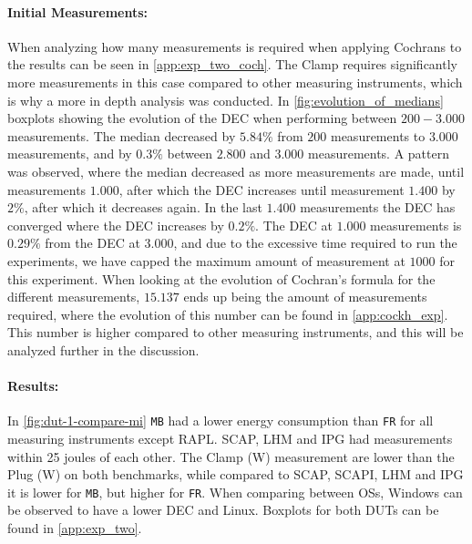 \paragraph{Initial Measurements:} When analyzing how many measurements is required when applying Cochrans to the results can be seen in \cref{app:exp_two_coch}. %
The Clamp requires significantly more measurements in this case compared to other measuring instruments, which is why a more in depth analysis was conducted. In \cref{fig:evolution_of_medians} boxplots showing the evolution of the DEC when performing between $200-3.000$ measurements. The median decreased by $5.84\%$ from $200$ measurements to $3.000$ measurements, and by $0.3\%$ between $2.800$ and $3.000$ measurements. A pattern was observed, where the median decreased as more measurements are made, until measurements $1.000$, after which the DEC increases until measurement $1.400$ by $2\%$, after which it decreases again. In the last $1.400$ measurements the DEC has converged where the DEC increases by $0.2\%$. The DEC at $1.000$ measurements is $0.29\%$ from the DEC at $3.000$, and due to the excessive time required to run the experiments, we have capped the maximum amount of measurement at $1000$ for this experiment. When looking at the evolution of Cochran's formula for the different measurements, $15.137$ ends up being the amount of measurements required, where the evolution of this number can be found in \cref{app:cockh_exp}. This number is higher compared to other measuring instruments, and this will be analyzed further in the discussion.


\paragraph{Results:} %
In \cref{fig:dut-1-compare-mi} \texttt{MB} had a lower energy consumption than \texttt{FR} for all measuring instruments except RAPL. SCAP, LHM and IPG had measurements within 25 joules of each other. The Clamp (W) measurement are lower than the Plug (W) on both benchmarks, while compared to SCAP, SCAPI, LHM and IPG it is lower for \texttt{MB}, but higher for \texttt{FR}. When comparing between OSs, Windows can be observed to have a lower DEC and Linux. Boxplots for both DUTs can be found in \cref{app:exp_two}.

